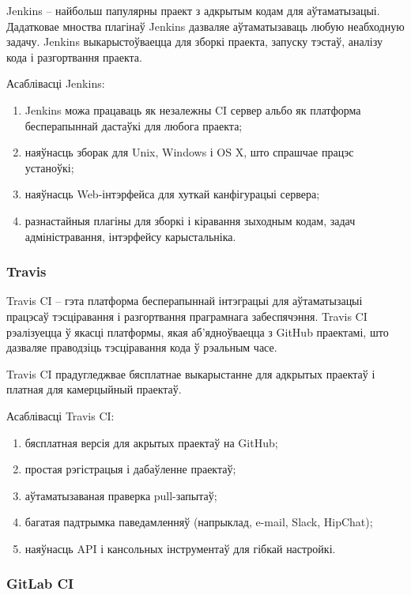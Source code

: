 Jenkins -- найбольш папулярны праект з адкрытым кодам для аўтаматызацыі.
Дадатковае мноства плагінаў Jenkins дазваляе аўтаматызаваць
любую неабходную задачу.
Jenkins выкарыстоўваецца для зборкі праекта, запуску тэстаў,
аналізу кода і разгортвання праекта.

Асаблівасці Jenkins:
\begin{enumerate}
    \item Jenkins можа працаваць як незалежны CI сервер альбо
          як платформа бесперапыннай дастаўкі для любога праекта;
    \item наяўнасць зборак для Unix, Windows і OS X, што
          спрашчае працэс устаноўкі;
    \item наяўнасць Web-інтэрфейса для хуткай канфігурацыі сервера;
    \item разнастайныя плагіны для зборкі і кіравання зыходным кодам,
          задач адміністравання, інтэрфейсу карыстальніка.
\end{enumerate}

\subsubsection{Travis}

Travis CI -- гэта платформа бесперапыннай інтэграцыі для аўтаматызацыі
працэсаў тэсціравання і разгортвання праграмнага забеспячэння.
Travis CI рэалізуецца ў якасці платформы, якая аб'ядноўваецца з
GitHub праектамі, што дазваляе праводзіць тэсціравання кода
ў рэальным часе.

Travis CI прадугледжвае бясплатнае выкарыстанне для адкрытых праектаў і
платная для камерцыйный праектаў.

Асаблівасці Travis CI:
\begin{enumerate}
    \item бясплатная версія для акрытых праектаў на GitHub;
    \item простая рэгістрацыя і дабаўленне праектаў;
    \item аўтаматызаваная праверка pull-запытаў;
    \item багатая падтрымка паведамленняў
          (напрыклад, e-mail, Slack, HipChat);
    \item наяўнасць API і кансольных інструментаў для
          гібкай настройкі.
\end{enumerate}

\subsubsection{GitLab CI}

